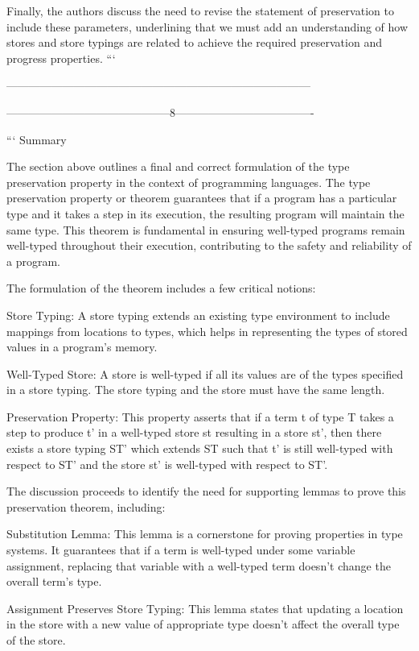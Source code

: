 Finally, the authors discuss the need to revise the statement of preservation to include these parameters, underlining that we must add an understanding of how stores and store typings are related to achieve the required preservation and progress properties.
```

---------------------------------------------------------------------------------

--------------------------------------------8-------------------------------------

```
Summary

The section above outlines a final and correct formulation of the type preservation property in the context of programming languages. The type preservation property or theorem guarantees that if a program has a particular type and it takes a step in its execution, the resulting program will maintain the same type. This theorem is fundamental in ensuring well-typed programs remain well-typed throughout their execution, contributing to the safety and reliability of a program.

The formulation of the theorem includes a few critical notions:

    Store Typing: A store typing extends an existing type environment to include mappings from locations to types, which helps in representing the types of stored values in a program's memory.

    Well-Typed Store: A store is well-typed if all its values are of the types specified in a store typing. The store typing and the store must have the same length.

    Preservation Property: This property asserts that if a term t of type T takes a step to produce t' in a well-typed store st resulting in a store st', then there exists a store typing ST' which extends ST such that t' is still well-typed with respect to ST' and the store st' is well-typed with respect to ST'.

The discussion proceeds to identify the need for supporting lemmas to prove this preservation theorem, including:

    Substitution Lemma: This lemma is a cornerstone for proving properties in type systems. It guarantees that if a term is well-typed under some variable assignment, replacing that variable with a well-typed term doesn't change the overall term's type.

    Assignment Preserves Store Typing: This lemma states that updating a location in the store with a new value of appropriate type doesn't affect the overall type of the store.


